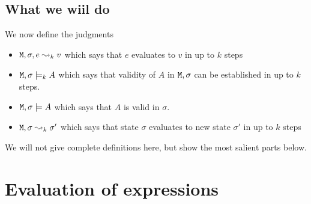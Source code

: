 \documentclass[acmsmall,screen]{acmart}
\begin{document}
\subsection{What we wiil do}

We now define the judgments
\begin{itemize}
\item ${\mbox{\tt{M}}}, \sigma, e \leadsto_k v$ which says that $e$ evaluates to $v$ in up to $k$ steps
\item ${\mbox{\tt{M}}}, \sigma \models_k A$  which says that validity of $A$ in  ${\mbox{\tt{M}}}, \sigma$ can be established in up to $k$ steps.
\item ${\mbox{\tt{M}}}, \sigma \models  A$  which says that $A$ is valid in $\sigma$.

\item ${\mbox{\tt{M}}}, \sigma\leadsto_k \sigma'$ which says that state $\sigma$ evaluates to new state $\sigma'$ in up to $k$ steps
\end{itemize}

We will not give complete definitions here, but show the most salient parts below.



\section{Evaluation of expressions}
\end{document}
